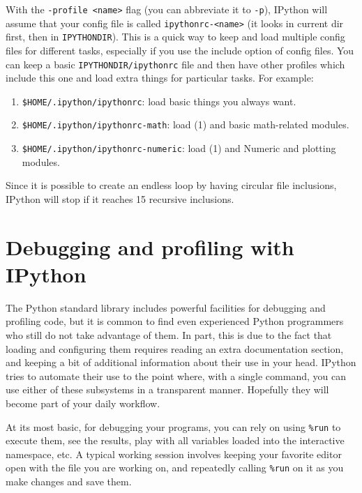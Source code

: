 With the \texttt{-profile <name>} flag (you can abbreviate it to \texttt{-p}),
IPython will assume that your config file is called \texttt{ipythonrc-<name>}
(it looks in current dir first, then in \texttt{IPYTHONDIR}). This
is a quick way to keep and load multiple config files for different
tasks, especially if you use the include option of config files. You
can keep a basic \texttt{IPYTHONDIR/ipythonrc} file and then have
other profiles which include this one and load extra things for particular
tasks. For example:

\begin{enumerate}
\item \texttt{\$HOME/.ipython/ipythonrc}: load basic things you always want. 
\item \texttt{\$HOME/.ipython/ipythonrc-math}: load (1) and basic math-related
modules. 
\item \texttt{\$HOME/.ipython/ipythonrc-numeric}: load (1) and Numeric and
plotting modules.
\end{enumerate}
Since it is possible to create an endless loop by having circular
file inclusions, IPython will stop if it reaches 15 recursive inclusions.


\section[Debugging and profiling]{Debugging and profiling with IPython }

The Python standard library includes powerful facilities for debugging
and profiling code, but it is common to find even experienced Python
programmers who still do not take advantage of them. In part, this
is due to the fact that loading and configuring them requires reading
an extra documentation section, and keeping a bit of additional information
about their use in your head. IPython tries to automate their use
to the point where, with a single command, you can use either of these
subsystems in a transparent manner. Hopefully they will become part
of your daily workflow.

At its most basic, for debugging your programs, you can rely on using
\texttt{\%run} to execute them, see the results, play with all variables
loaded into the interactive namespace, etc. A typical working session
involves keeping your favorite editor open with the file you are working
on, and repeatedly calling \texttt{\%run} on it as you make changes
and save them.

